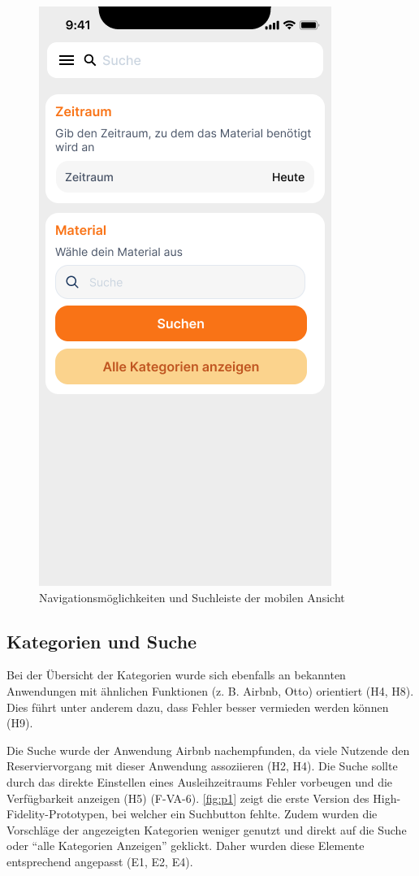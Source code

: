 \begin{figure}[h]
    \includegraphics[scale=0.4]{Bilder/Prototyp/Neu/Suche V2.png}
    \caption{Navigationsmöglichkeiten und Suchleiste der mobilen Ansicht}
    \label{fig:nav}
\end{figure}

\subsection{Kategorien und Suche}
Bei der Übersicht der Kategorien wurde sich ebenfalls an bekannten Anwendungen
mit ähnlichen Funktionen (z. B. Airbnb, Otto) orientiert (H4, H8). Dies führt
unter anderem dazu, dass Fehler besser vermieden werden können (H9).

Die Suche wurde der Anwendung Airbnb \cite{airbnb2022}
nachempfunden, da viele Nutzende den Reserviervorgang mit dieser Anwendung
assoziieren (H2, H4). Die Suche sollte durch das direkte Einstellen eines
Ausleihzeitraums Fehler vorbeugen und die Verfügbarkeit anzeigen (H5) (F-VA-6).
\ref{fig:p1} zeigt die erste Version des High-Fidelity-Prototypen, bei welcher
ein Suchbutton fehlte. Zudem wurden die Vorschläge der angezeigten Kategorien
weniger genutzt und direkt auf die Suche oder \enquote{alle Kategorien Anzeigen}
geklickt. Daher wurden diese Elemente entsprechend angepasst (E1, E2, E4).

